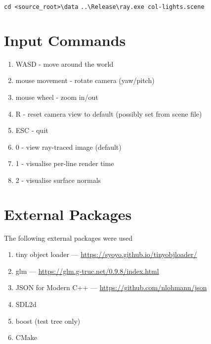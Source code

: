 \verb|cd <source_root>\data|
\verb|..\Release\ray.exe col-lights.scene|

\section{Input Commands}
    \begin{enumerate}
    \item WASD - move around the world
    \item mouse movement - rotate camera (yaw/pitch)
    \item mouse wheel - zoom in/out
    \item R - reset camera view to default (possibly set from scene file)
    \item ESC - quit
    \item 0 - view ray-traced image (default)
    \item 1 - visualise per-line render time
    \item 2 - visualise surface normals
    \end{enumerate}

\section{External Packages}
The following external packages were used 
\begin{enumerate}
    \item tiny object loader --- \url{https://syoyo.github.io/tinyobjloader/}
    \item glm --- \url{https://glm.g-truc.net/0.9.8/index.html}
    \item JSON for Modern C++ --- \url{https://github.com/nlohmann/json}
    \item SDL2d
    \item boost (test tree only)
    \item CMake
\end{enumerate}

